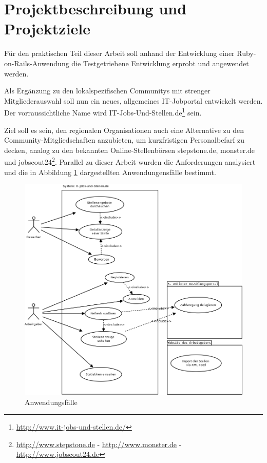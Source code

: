 \section{Projektbeschreibung und Projektziele}
Für den praktischen Teil dieser Arbeit soll anhand der Entwicklung einer Ruby-on-Rails\hyp{}Anwendung die Testgetriebene Entwicklung erprobt und angewendet werden.

Als Ergänzung zu den lokalspezifischen Communitys mit strenger Mitgliederauswahl soll nun ein neues, allgemeines IT-Jobportal entwickelt werden. Der vorraussichtliche Name wird IT-Jobs-Und-Stellen.de\footnote{\url{http://www.it-jobs-und-stellen.de/}} sein.

Ziel soll es sein, den regionalen Organisationen auch eine Alternative zu den Community-Mitgliedschaften anzubieten, um kurzfristigen Personalbefarf zu decken, analog zu den bekannten Online-Stellenbörsen stepstone.de, monster.de und jobscout24\footnote{\url{http://www.stepstone.de} - \url{http://www.monster.de} - \url{http://www.jobscout24.de}}. Parallel zu dieser Arbeit wurden die Anforderungen analysiert und die in Abbildung \ref{fig:usecases} dargestellten Anwendungensfälle bestimmt.


\begin{figure}[htbp]
 \centering
 \includegraphics[width=1\textwidth]{./material/usecases.png}
 \caption{Anwendungsfälle}
 \label{fig:usecases}
\end{figure}


